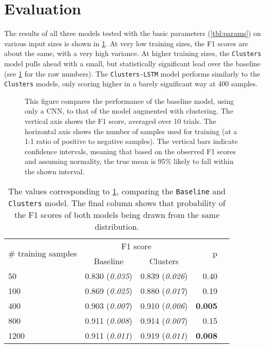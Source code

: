 \section{Evaluation}
\FloatBarrier%
The results of all three models tested with the basic parameters
(\cref{tbl:params}) on various input sizes is shown in \cref{fig:result}. At
very low training sizes, the F1 scores are about the same, with a very high
variance. At higher training sizes, the \texttt{Clusters} model pulls ahead with
a small, but statistically significant lead over the baseline
(see \cref{tbl:base_cl} for the raw numbers). The \texttt{Clusters-LSTM} model
performs similarly to the \texttt{Clusters} models, only scoring higher in a
barely significant way at 400 samples. 

\begin{figure}[tb]
  \centering
  \caption{This figure compares the performance of the baseline model, using
    only a CNN, to that of the model augmented with clustering. The vertical axis
    shows the F1 score, averaged over 10 trials. The horizontal axis shows the
    number of samples used for training (at a 1:1 ratio of positive to negative
    samples). The vertical bars indicate confidence intervals, meaning that based on
    the observed F1 scores and assuming normality, the true mean is 95\% likely to
  fall within the shown interval.\label{fig:result}}
\end{figure}
\begin{table}[tb]
  \centering
  \begin{tabular}{lrrrr}
    \toprule
    \multirow{2}[3]{*}{\# training samples} & \multicolumn{2}{c}{F1 score} & \multirow{2}[3]{*}{p} \\
    \cmidrule(lr){2-3}
    & \multicolumn{1}{c}{Baseline} & \multicolumn{1}{c}{Clusters} & \\
    \midrule
    50   & 0.830 (\emph{0.035}) & 0.839 (\emph{0.026}) & 0.40 \\
    100  & 0.869 (\emph{0.025}) & 0.880 (\emph{0.017}) & 0.19 \\
    400  & 0.903 (\emph{0.007}) & 0.910 (\emph{0.006}) & \textbf{0.005} \\
    800  & 0.911 (\emph{0.008}) & 0.914 (\emph{0.007}) & 0.15 \\
    1200 & 0.911 (\emph{0.011}) & 0.919 (\emph{0.011}) & \textbf{0.008} \\
    \bottomrule
  \end{tabular}
  \caption{The values corresponding to \cref{fig:result}, comparing the
    \texttt{Baseline} and \texttt{Clusters} model. The final column shows
    that probability of the F1 scores of both models being drawn from the same
  distribution.\label{tbl:base_cl}}
\end{table}
